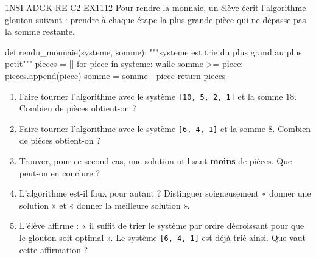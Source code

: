 

\begin{exercice}{1NSI-ADGK-RE-C2-EX1}{1}{12}
Pour rendre la monnaie, un élève écrit l'algorithme glouton suivant : prendre à chaque
étape la plus grande pièce qui ne dépasse pas la somme restante.
\begin{python}
def rendu_monnaie(systeme, somme):
    """systeme est trie du plus grand au plus petit"""
    pieces = []
    for piece in systeme:
        while somme >= piece:
            pieces.append(piece)
            somme = somme - piece
    return pieces
\end{python}
\begin{enumerate}
  \item Faire tourner l'algorithme avec le système \lstinline{[10, 5, 2, 1]} et la somme
    $18$. Combien de pièces obtient-on ?
  \item Faire tourner l'algorithme avec le système \lstinline{[6, 4, 1]} et la somme $8$.
    Combien de pièces obtient-on ?
  \item Trouver, pour ce second cas, une solution utilisant \textbf{moins} de pièces. Que
    peut-on en conclure ?
  \item L'algorithme est-il faux pour autant ? Distinguer soigneusement « donner une
    solution » et « donner la meilleure solution ».
  \item L'élève affirme : « il suffit de trier le système par ordre décroissant pour que le
    glouton soit optimal ». Le système \lstinline{[6, 4, 1]} est déjà trié ainsi.
    Que vaut cette affirmation ?
\end{enumerate}
\end{exercice}

